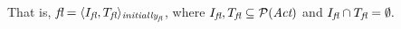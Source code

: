 That is,
$ \emph{fl} = \langle I_{\emph{fl}}, T_{\emph{fl}} \rangle_{\emph{initially}_{\emph{fl}}} $, 
where 
$I_{\emph{fl}},T_{\emph{fl}} \subseteq \mathcal{P}(\emph{Act})$ 
and $I_{\emph{fl}} \cap T_{\emph{fl}} = \emptyset.$\\


%
